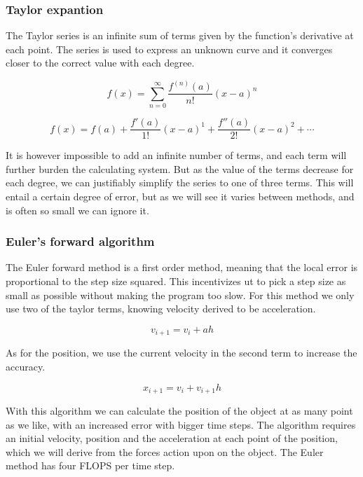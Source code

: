 \documentclass[10pt]{article}
\begin{document}
\begin{multicols}{2}
\subsubsection{Taylor expantion}
The Taylor series is an infinite sum of terms given by the function's
derivative at each point. The series is used to express an unknown
curve and it converges closer to the correct value with each degree. 

\begin{equation}
   f(x) =  \sum_{n=0}^\infty\frac{f^{(n)}(a)}{n!}(x-a)^n
\end{equation}

\begin{equation}
    f(x) = f(a)+ \frac{f'(a)}{1!}(x-a)^1+\frac{f''(a)}{2!}(x-a)^2+\cdots
\end{equation}

It is however impossible to add an infinite number of terms, and each term
will further burden the calculating system. But as the value of the terms
decrease for each degree, we can justifiably simplify the series to one of
three terms. This will entail a certain degree of error, but as we will see
it varies between methods, and is often so small we can ignore it.

\subsubsection{Euler's forward algorithm}
The Euler forward method is a first order method, meaning that the local
error is proportional to the step size squared. This incentivizes ut to
pick a step size as small as possible without making the program too slow.
For this method we only use two of the taylor terms, knowing velocity
derived to be acceleration.  

\begin{equation}
    v_{i+1} = v_i +ah
\end{equation}

As for the position, we use the current velocity in the second term to
increase the accuracy.

\begin{equation}
    x_{i+1} = v_i +v_{i+1}h
\end{equation}

With this algorithm we can calculate the position of the object at as many
point as we like, with an increased error with bigger time steps. The
algorithm requires an initial velocity, position and the acceleration at
each point of the position, which we will derive from the forces action
upon on the object. The Euler method has four FLOPS per time step.\\


\end{multicols}
\end{document}
